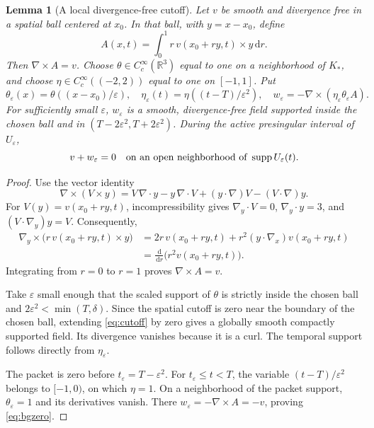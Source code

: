 \documentclass[11pt,a4paper]{article}
\newtheorem{lemma}[theorem]{Lemma}
\theoremstyle{definition}\newtheorem{definition}[theorem]{Definition}
\theoremstyle{remark}\newtheorem{remark}[theorem]{Remark}
\newcommand{\R}{\mathbb R}\newcommand{\TT}{\mathbb T^3}
\newcommand{\dd}{\,\mathrm d}\newcommand{\eps}{\varepsilon}
\DeclareMathOperator{\supp}{supp}
\begin{document}
\begin{lemma}[A local divergence-free cutoff]\label{lem:potential}
Let $v$ be smooth and divergence free in a spatial ball centered at $x_0$. In that ball, with $y=x-x_0$, define
\begin{equation}\label{eq:potential}
 A(x,t)=\int_0^1 r\,v(x_0+ry,t)\times y\dd r.
\end{equation}
Then $\nabla\times A=v$. Choose $\theta\in C_c^\infty(\R^3)$ equal to one on a neighborhood of $K_*$, and choose
$\eta\in C_c^\infty((-2,2))$ equal to one on $[-1,1]$. Put
\begin{equation}\label{eq:cutoff}
 \theta_\eps(x)=\theta((x-x_0)/\eps),\quad
 \eta_\eps(t)=\eta((t-T)/\eps^2),\quad
 w_\eps=-\nabla\times(\eta_\eps\theta_\eps A).
\end{equation}
For sufficiently small $\eps$, $w_\eps$ is a smooth, divergence-free field supported inside the chosen ball and in
$(T-2\eps^2,T+2\eps^2)$. During the active presingular interval of $U_\eps$,
\begin{equation}\label{eq:bgzero}
 v+w_\eps=0
 \quad\hbox{on an open neighborhood of }\supp U_\eps(t).
\end{equation}
\end{lemma}
\begin{proof}
Use the vector identity
\[
 \nabla\times(V\times y)
 =V\,\nabla\cdot y-y\,\nabla\cdot V
   +(y\cdot\nabla)V-(V\cdot\nabla)y.
\]
For $V(y)=v(x_0+ry,t)$, incompressibility gives $\nabla_y\cdot V=0$,
$\nabla_y\cdot y=3$, and $(V\cdot\nabla_y)y=V$.
Consequently,
\begin{align*}
 \nabla_y\times\bigl(r\,v(x_0+ry,t)\times y\bigr)
 &=2r\,v(x_0+ry,t)+r^2(y\cdot\nabla_x)v(x_0+ry,t)\\
 &=\frac{\dd}{\dd r}\bigl(r^2v(x_0+ry,t)\bigr).
\end{align*}
Integrating from $r=0$ to $r=1$ proves $\nabla\times A=v$.

Take $\eps$ small enough that the scaled support of $\theta$ is strictly inside the chosen ball and $2\eps^2<\min(T,\delta)$. Since the spatial cutoff is zero near the boundary of the chosen ball, extending \eqref{eq:cutoff} by zero gives a globally smooth compactly supported field. Its divergence vanishes because it is a curl. The temporal support follows directly from $\eta_\eps$.

The packet is zero before $t_\eps=T-\eps^2$. For
$t_\eps\le t<T$, the variable $(t-T)/\eps^2$ belongs to $[-1,0)$, on which $\eta=1$. On a neighborhood of the packet support, $\theta_\eps=1$ and its derivatives vanish. There $w_\eps=-\nabla\times A=-v$, proving \eqref{eq:bgzero}.
\end{proof}
\end{document}
